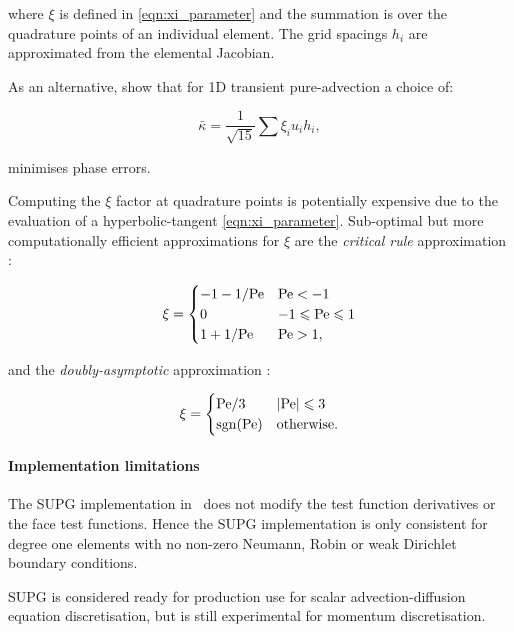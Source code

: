 where $\xi$ is defined in \eqref{eqn:xi_parameter} and the summation is over the quadrature points of an individual element. The
grid spacings $h_i$ are approximated from the elemental Jacobian.

As an alternative, \citet{raymond1976} show that for
1D transient pure-advection a choice of:

\begin{equation}\label{eqn:md_nu_bar_transient}
  \bar{\kappa} = \frac{1}{\sqrt{15}} \sum{\xi_i u_i h_i},
\end{equation}

minimises phase errors.

Computing the $\xi$ factor at quadrature points is potentially expensive due to
the evaluation of a hyperbolic-tangent \eqref{eqn:xi_parameter}. Sub-optimal but more computationally
efficient approximations for $\xi$ are the \emph{critical rule} approximation \citep{brooks1982}:

\begin{equation}
  \xi = \begin{cases}
          -1 - 1 / \mathrm{Pe}  & \mathrm{Pe} < -1 \\
          0             & -1 \leqslant \mathrm{Pe} \leqslant 1 \\
          1 + 1 / \mathrm{Pe}   & \mathrm{Pe} > 1,
        \end{cases}
\end{equation}

and the \emph{doubly-asymptotic} approximation \citep{DoneaBook}:

\begin{equation}
  \xi = \begin{cases}
          \mathrm{Pe} / 3  & \left| \mathrm{Pe} \right| \leqslant 3 \\
          \operatorname{sgn}(\mathrm{Pe})  & \textrm{otherwise}.
        \end{cases}
\end{equation}

\paragraph{Implementation limitations}

The SUPG implementation in \fluidity\ does not modify the test function derivatives
or the face test functions. Hence the SUPG implementation is only consistent
for degree one elements with no non-zero Neumann, Robin or weak Dirichlet boundary
conditions.

SUPG is considered ready for production use for scalar advection-diffusion
equation discretisation, but is still experimental for momentum discretisation.

